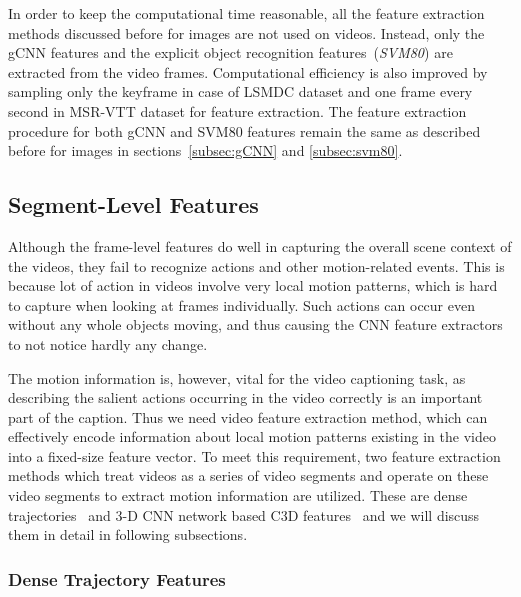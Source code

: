 In order to keep the computational time reasonable, all the feature extraction
methods discussed before for images are not used on videos.
Instead, only the gCNN features and the explicit object recognition
features~(\emph{SVM80}) are extracted from the video frames.
Computational efficiency is also improved by sampling only the keyframe in case
of LSMDC dataset and one frame every second in MSR-VTT dataset for feature
extraction.
The feature extraction procedure for both gCNN and SVM80 features remain the
same as described before for images in sections~\ref{subsec:gCNN} and
\ref{subsec:svm80}. 

\subsection{Segment-Level Features}
Although the frame-level features do well in capturing the overall scene
context of the videos, they fail to recognize actions and other motion-related
events.
This is because lot of action in videos involve very local motion patterns,
which is hard to capture when looking at frames individually.
Such actions can occur even without any whole objects moving, and thus causing
the CNN feature extractors to not notice hardly any change.

The motion information is, however, vital for the video captioning task, as
describing the salient actions occurring in the video correctly is an important
part of the caption.
Thus we need video feature extraction method, which can effectively encode
information about local motion patterns existing in the video into a fixed-size
feature vector.
To meet this requirement, two feature extraction methods which treat videos as a
series of video segments and operate on these video segments to extract motion
information are utilized.
These are dense trajectories~\cite{DBLP:conf/cvpr/WangKSL11, Wang2013} and 3-D CNN
network based C3D features~\cite{DBLP:C3D} and we will discuss them in detail in
following subsections.

\subsubsection{Dense Trajectory Features}


